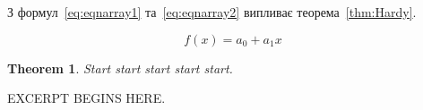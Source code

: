 \documentclass{report}
\newtheorem{theorem}{Theorem}[chapter]
\begin{document}
З формул~\eqref{eq:eqnarray1} та~\eqref{eq:eqnarray2} випливає
теорема~\ref{thm:Hardy}.


\begin{equation}\label{eq:aref.intro1}
f(x)=a_0+a_1x
\end{equation}

\begin{theorem}\label{thm:aref.intro1}
Start start start start start.
\end{theorem}

EXCERPT BEGINS HERE.\hrulefill

\end{document}
